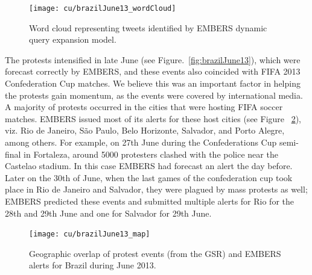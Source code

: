 \begin{figure}[H]
\centering
\texttt{[image: cu/brazilJune13\_wordCloud]}
\caption{Word cloud representing tweets identified by EMBERS dynamic query expansion model.}
\label{fig:brazilJune13_wordCloud}
\end{figure}

The protests intensified in late June (see Figure.~\ref{fig:brazilJune13}), which were
forecast correctly by EMBERS, and these events
also coincided with FIFA 2013 Confederation Cup matches. We believe this was an important factor in helping
the protests gain momentum,
as the events were covered by international media. A majority of protests
occurred in the cities that were hosting FIFA soccer matches.
EMBERS issued most of its alerts for these host cities (see Figure
~\ref{fig:brazilJune13_map}), viz.
Rio de Janeiro, São Paulo,
Belo Horizonte, Salvador, and Porto Alegre,
among others. For example, on 27th June during the Confederations Cup
semi-final in Fortaleza, around 5000 protesters clashed with the police
near the Castelao stadium. In this case EMBERS had forecast an alert the
day before. Later on the 30th of June, when the last games of the
confederation cup took place in Rio de Janeiro and Salvador, they
were plagued by mass protests as well; EMBERS predicted these events and
submitted multiple alerts for Rio for the 28th and 29th June and one for
Salvador for 29th June.

\begin{figure}[H]
\centering
\texttt{[image: cu/brazilJune13\_map]}
\caption{Geographic overlap of protest events (from the GSR) and EMBERS
alerts for Brazil during June 2013.}
\label{fig:brazilJune13_map}
\end{figure}

